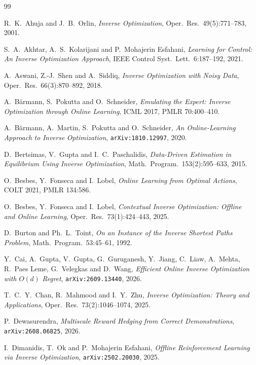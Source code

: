 \documentclass[11pt]{article}
\theoremstyle{plain}
\theoremstyle{definition}
\theoremstyle{remark}
\begin{document}
\begin{thebibliography}{99}

R.~K.~Ahuja and J.~B.~Orlin,
\emph{Inverse Optimization},
Oper.\ Res.\ 49(5):771--783, 2001.

S.~A.~Akhtar, A.~S.~Kolarijani and P.~Mohajerin Esfahani,
\emph{Learning for Control: An Inverse Optimization Approach},
IEEE Control Syst.\ Lett.\ 6:187--192, 2021.

A.~Aswani, Z.-J.~Shen and A.~Siddiq,
\emph{Inverse Optimization with Noisy Data},
Oper.\ Res.\ 66(3):870--892, 2018.

A.~B\"armann, S.~Pokutta and O.~Schneider,
\emph{Emulating the Expert: Inverse Optimization through Online Learning},
ICML 2017, PMLR 70:400--410.

A.~B\"armann, A.~Martin, S.~Pokutta and O.~Schneider,
\emph{An Online-Learning Approach to Inverse Optimization},
\texttt{arXiv:1810.12997}, 2020.

D.~Bertsimas, V.~Gupta and I.~C.~Paschalidis,
\emph{Data-Driven Estimation in Equilibrium Using Inverse Optimization},
Math.\ Program.\ 153(2):595--633, 2015.

O.~Besbes, Y.~Fonseca and I.~Lobel,
\emph{Online Learning from Optimal Actions},
COLT 2021, PMLR 134:586.

O.~Besbes, Y.~Fonseca and I.~Lobel,
\emph{Contextual Inverse Optimization: Offline and Online Learning},
Oper.\ Res.\ 73(1):424--443, 2025.

D.~Burton and Ph.~L.~Toint,
\emph{On an Instance of the Inverse Shortest Paths Problem},
Math.\ Program.\ 53:45--61, 1992.

Y.~Cai, A.~Gupta, V.~Gupta, G.~Guruganesh, Y.~Jiang, C.~Liaw, A.~Mehta, R.~Paes Leme, G.~Velegkas
and D.~Wang,
\emph{Efficient Online Inverse Optimization with $O(d)$ Regret},
\texttt{arXiv:2609.13440}, 2026.

T.~C.~Y.~Chan, R.~Mahmood and I.~Y.~Zhu,
\emph{Inverse Optimization: Theory and Applications},
Oper.\ Res.\ 73(2):1046--1074, 2025.

P.~Dewasurendra,
\emph{Multiscale Reward Hedging from Correct Demonstrations},
\texttt{arXiv:2608.06825}, 2026.

I.~Dimanidis, T.~Ok and P.~Mohajerin Esfahani,
\emph{Offline Reinforcement Learning via Inverse Optimization},
\texttt{arXiv:2502.20030}, 2025.


\end{thebibliography}
\end{document}
